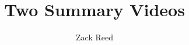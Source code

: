 \documentclass{ximera}
\author{Zack Reed}
\title{Two Summary Videos}
\begin{document}
\begin{abstract}

\end{abstract}
\maketitle




\end{document}

